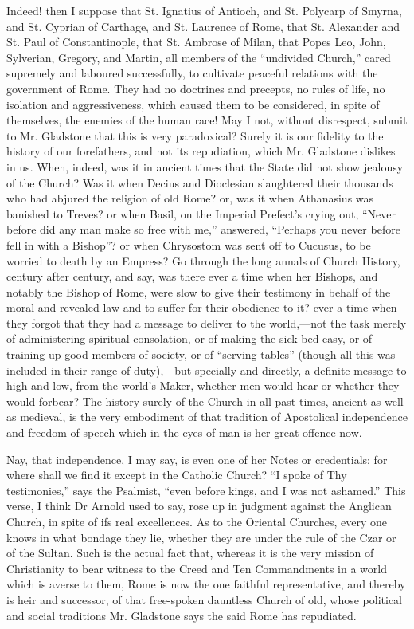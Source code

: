 Indeed! then I suppose that St. Ignatius of Antioch, and St. Polycarp
of Smyrna, and St. Cyprian of Carthage, and St. Laurence of Rome, that
St. Alexander and St. Paul of Constantinople, that St. Ambrose of Milan,
that Popes Leo, John, Sylverian, Gregory, and Martin, all members of the
``undivided Church,'' cared supremely and laboured successfully,
to cultivate peaceful relations with the government of Rome. They had no
doctrines and precepts, no rules of life, no isolation and
aggressiveness, which caused them to be considered, in spite of
themselves, the enemies of the human race! May I not, without
disrespect, submit to Mr. Gladstone that this is very paradoxical?
Surely it is our fidelity to the history of our forefathers, and not its
repudiation, which Mr. Gladstone dislikes in us. When, indeed, was it in
ancient times that the State did not show jealousy of the Church? Was it
when Decius and Dioclesian slaughtered their thousands who had abjured
the religion of old Rome? or, was it when Athanasius was banished to
Treves? or when Basil, on the Imperial Prefect's crying out, ``Never
before did any man make so free with me,'' answered, ``Perhaps
you never before fell in with a Bishop''? or when Chrysostom was
sent off to Cucusus, to be worried to death by an Empress? Go
through the long annals of Church History, century after century, and
say, was there ever a time when her Bishops, and notably the Bishop of
Rome, were slow to give their testimony in behalf of the moral and
revealed law and to suffer for their obedience to it? ever a time when
they forgot that they had a message to deliver to the world,—not the
task merely of administering spiritual consolation, or of making the
sick-bed easy, or of training up good members of society, or of ``serving tables'' (though all this was included in their range of
duty),—but specially and directly, a definite message to high and low,
from the world's Maker, whether men would hear or whether they would
forbear? The history surely of the Church in all past times, ancient as
well as medieval, is the very embodiment of that tradition of
Apostolical independence and freedom of speech which in the eyes of man
is her great offence now.

Nay, that independence, I may say, is even one of her Notes or
credentials; for where shall we find it except in the Catholic Church?
``I spoke of Thy testimonies,'' says the Psalmist, ``even
before kings, and I was not ashamed.'' This verse, I think Dr Arnold
used to say, rose up in judgment against the Anglican Church, in spite
of ifs real excellences. As to the Oriental Churches, every one knows in
what bondage they lie, whether they are under the rule of the Czar or of
the Sultan. Such is the actual fact that, whereas it is the very mission
of Christianity to bear witness to the Creed and Ten Commandments in a
world which is averse to them, Rome is now the one faithful
representative, and thereby is heir and successor, of that free-spoken
dauntless Church of old, whose political and social traditions Mr.
Gladstone says the said Rome has repudiated.

